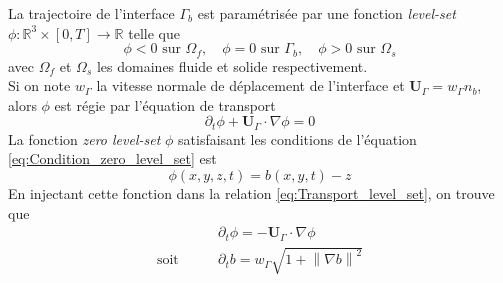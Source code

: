 \documentclass[11pt, a4paper, oneside]{report}
\begin{document}
La trajectoire de l'interface $\Gamma_b$ est paramétrisée par une fonction \textit{level-set} $\phi : \mathbb{R}^3 \times [0, T] \longrightarrow \mathbb{R}$ telle que
\begin{equation} \label{eq:Condition_zero_level_set}
    \phi < 0 \text{ sur } \Omega_f, \quad \phi = 0 \text{ sur } \Gamma_b, \quad \phi > 0 \text{ sur } \Omega_s
\end{equation}
avec $\Omega_f$ et $\Omega_s$ les domaines fluide et solide respectivement. \\
Si on note $w_\Gamma$ la vitesse normale de déplacement de l'interface et $\bm{U}_\Gamma = w_\Gamma n_b$, alors $\phi$ est régie par l'équation de transport
\begin{equation} \label{eq:Transport_level_set}
    \partial_t \phi + \bm{U}_\Gamma \cdot \nabla \phi = 0
\end{equation}
La fonction \textit{zero level-set} $\phi$ satisfaisant les conditions de l'équation \eqref{eq:Condition_zero_level_set} est
\begin{equation}
    \phi(x, y, z, t) = b(x, y, t) - z
\end{equation}
En injectant cette fonction dans la relation \eqref{eq:Transport_level_set}, on trouve que
\begin{equation} \label{eq:Formulation_level_set_exner}
    \begin{aligned}
        &\partial_t \phi = - \bm{U}_\Gamma \cdot \nabla \phi \\
        \text{soit} \qquad &\partial_t b = w_\Gamma \sqrt{1 + \left\| \nabla b \right\|^2}
    \end{aligned}
\end{equation}
\end{document}
